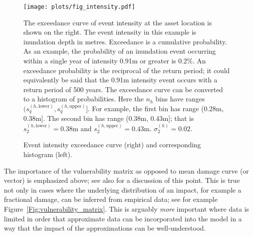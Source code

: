 \documentclass[a4paper,11pt]{extarticle} %
\theoremstyle{definition}
\begin{document}
\begin{figure}[ht]

    \begin{framed}

        \texttt{[image: plots/fig\_intensity.pdf]}

    \end{framed}

    \footnotesize

    \renewcommand{\arraystretch}{1.01}

    \vspace{-3ex}

    {\justify
        The exceedance curve of event intensity at the asset location is shown on the right. The event intensity in this example is inundation depth in metres. Exceedance is a cumulative probability. As an example, the probability of an inundation event occurring within a single year of intensity 0.91m or greater is 0.2\%. An exceedance probability is the reciprocal of the return period; it could equivalently be said that the 0.91m intensity event occurs with a return period of 500 years.
        The exceedance curve can be converted to a histogram of probabilities. Here the $n_h$ bins have ranges $(s^{(h, \text{lower})}_q, s^{(h, \text{upper})}_q]$. For example, the first bin has range (0.28m, 0.38m]. The second bin has range (0.38m,    0.43m]; that is $s^{(h, \text{lower})}_2 = 0.38$m and $s^{(h, \text{upper})}_2 = 0.43$m. $\sigma^{(h)}_2 = 0.02$.
        \par}

    \vspace{-0.5ex}

    \caption{\small Event intensity exceedance curve (right) and corresponding histogram (left).}
    \label{Fig:intensity}

\end{figure}


The importance of the vulnerability matrix as opposed to mean damage curve (or vector) is emphasized above; see also \cite{Taylor:2015} for a discussion of this point. This is true not only in cases where the underlying distribution of an impact, for example a fractional damage, can be inferred from empirical data; see for example Figure~\ref{Fig:vulnerability_matrix}. This is arguably \emph{more} important where data is limited in order that approximate data can be incorporated into the model in a way that the impact of the approximations can be well-understood.
\end{document}

